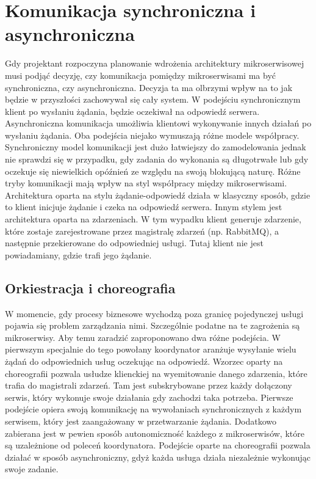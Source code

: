 \section{Komunikacja synchroniczna i asynchroniczna}
Gdy projektant rozpoczyna planowanie wdrożenia architektury mikroserwisowej musi podjąć decyzję, czy komunikacja pomiędzy mikroserwisami ma być synchroniczna, czy asynchroniczna. Decyzja ta ma olbrzymi wpływ na to jak będzie w przyszłości zachowywał się cały system. W podejściu synchronicznym klient po wysłaniu żądania, będzie oczekiwał na odpowiedź serwera. Asynchroniczna komunikacja umożliwia klientowi wykonywanie innych działań po wysłaniu żądania. Oba podejścia niejako wymuszają różne modele współpracy. Synchroniczny model komunikacji jest dużo łatwiejszy do zamodelowania jednak nie sprawdzi się w przypadku, gdy zadania do wykonania są długotrwałe lub gdy oczekuje się niewielkich opóźnień ze względu na swoją blokującą naturę. Różne tryby komunikacji mają wpływ na styl współpracy między mikroserwisami. Architektura oparta na stylu żądanie-odpowiedź działa w klasyczny sposób, gdzie to klient inicjuje żądanie i czeka na odpowiedź serwera. Innym stylem jest architektura oparta na zdarzeniach. W tym wypadku klient generuje zdarzenie, które zostaje zarejestrowane przez magistralę zdarzeń (np. RabbitMQ), a następnie przekierowane do odpowiedniej usługi. Tutaj klient nie jest powiadamiany, gdzie trafi jego żądanie.  
\subsection{Orkiestracja i choreografia}    
W momencie, gdy procesy biznesowe wychodzą poza granicę pojedynczej usługi pojawia się problem zarządzania nimi. Szczególnie podatne na te zagrożenia są mikroserwisy. Aby temu zaradzić zaproponowano dwa różne podejścia. W pierwszym specjalnie do tego powołany koordynator aranżuje wysyłanie wielu żądań do odpowiednich usług oczekując na odpowiedź. Wzorzec oparty na choreografii pozwala usłudze klienckiej na wyemitowanie danego zdarzenia, które trafia do magistrali zdarzeń. Tam jest subskrybowane przez każdy dołączony serwis, który wykonuje swoje działania gdy zachodzi taka potrzeba. Pierwsze podejście opiera swoją komunikację na wywołaniach synchronicznych z każdym serwisem, który jest zaangażowany w przetwarzanie żądania. Dodatkowo zabierana jest w pewien sposób autonomiczność każdego z mikroserwisów, które są uzależnione od poleceń koordynatora. Podejście oparte na choreografii pozwala działać w sposób asynchroniczny, gdyż każda usługa działa niezależnie wykonując swoje zadanie.   